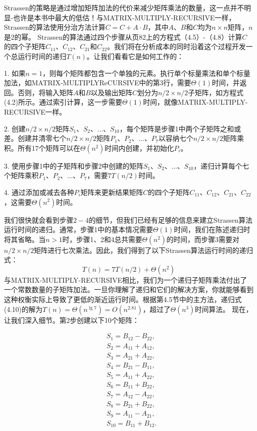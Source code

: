 \documentclass[lang=cn,newtx,10pt,scheme=chinese]{elegantbook}
\begin{document}
Strassen的策略是通过增加矩阵加法的代价来减少矩阵乘法的数量，这一点并不明显-也许是本书中最大的低估！与MATRIX-MULTIPLY-RECURSIVE一样，Strassen的算法使用分治方法计算$C=C+A \cdot B$，其中$A、B$和$C$均为$n \times n$矩阵，$n$是2的幂。 Strassen的算法通过四个步骤从页82上的方程式（4.5）-（4.8）计算$C$的四个子矩阵$C_{11}、C_{12}、C_{21}$和$C_{22}$。我们将在分析成本的同时沿着这个过程开发一个总运行时间的递归$T(n)$。让我们看看它是如何工作的：

1. 如果$n=1$，则每个矩阵都包含一个单独的元素。执行单个标量乘法和单个标量加法，如MATRIX-MULTIPLYReCURSIVE中的第3行，需要$\Theta(1)$时间，并返回。否则，将输入矩阵$A$和$B$以及输出矩阵$C$划分为$n/2\times n/2$子矩阵，如方程式(4.2)所示。通过索引计算，这一步需要$\Theta(1)$时间，就像MATRIX-MULTIPLY-RECURSIVE一样。

2. 创建$n/2\times n/2$矩阵$S_1、S_2、\ldots、S_{10}$，每个矩阵是步骤1中两个子矩阵之和或差。创建并清零七个$n/2\times n/2$矩阵$P_1、P_2、\ldots、P_7$以容纳七个$n/2\times n/2$矩阵乘积。所有17个矩阵可以在$\Theta\left(n^2\right)$时间内创建，并初始化$P_i$。

3. 使用步骤1中的子矩阵和步骤2中创建的矩阵$S_1、S_2、\ldots、S_{10}$，递归计算每个七个矩阵乘积$P_1、P_2、\ldots、P_7$，需要$7T(n/2)$时间。

4. 通过添加或减去各种$P_i$矩阵来更新结果矩阵$C$的四个子矩阵$C_{11}、C_{12}、C_{21}、C_{22}$，这需要$\Theta\left(n^2\right)$时间。

我们很快就会看到步骤$2-4$的细节，但我们已经有足够的信息来建立Strassen算法运行时间的递归。通常，步骤1中的基本情况需要$\Theta(1)$时间，我们在陈述递归时将其省略。当$n>1$时，步骤1、2和4总共需要$\Theta\left(n^2\right)$的时间，而步骤3需要对$n/2\times n/2$矩阵进行七次乘法。因此，我们得到了以下Strassen算法运行时间的递归式：
$$
T(n)=7 T(n / 2)+\Theta\left(n^2\right)
$$
与MATRIX-MULTIPLY-RECURSIVE相比，我们为一个递归子矩阵乘法付出了一个常数数量的子矩阵加法。一旦你理解了递归和它们的解决方案，你就能够看到这种权衡实际上导致了更低的渐近运行时间。根据第4.5节中的主方法，递归式(4.10)的解为$T(n)=\Theta\left(n^{\lg 7}\right)=O\left(n^{2.81}\right)$，超过了$\Theta\left(n^3\right)$时间算法。
现在，让我们深入细节。第2步创建以下10个矩阵：



$$
\begin{aligned}
& S_1=B_{12}-B_{22}, \\
& S_2=A_{11}+A_{12}, \\
& S_3=A_{21}+A_{22}, \\
& S_4=B_{21}-B_{11}, \\
& S_5=A_{11}+A_{22}, \\
& S_6=B_{11}+B_{22}, \\
& S_7=A_{12}-A_{22}, \\
& S_8=B_{21}+B_{22}, \\
& S_9=A_{11}-A_{21}, \\
& S_{10}=B_{11}+B_{12} .
\end{aligned}
$$
\end{document}
